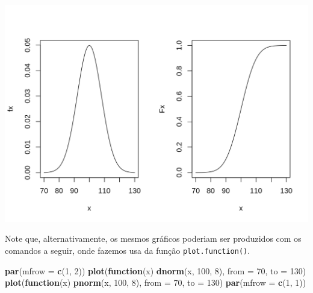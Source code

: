 \documentclass[10pt,a4paper]{book}
\newenvironment{Shaded}{\begin{snugshade}}{\end{snugshade}}
\newcommand{\KeywordTok}[1]{\textcolor[rgb]{0.13,0.29,0.53}{\textbf{#1}}}
\newcommand{\DataTypeTok}[1]{\textcolor[rgb]{0.13,0.29,0.53}{#1}}
\newcommand{\DecValTok}[1]{\textcolor[rgb]{0.00,0.00,0.81}{#1}}
\newcommand{\ControlFlowTok}[1]{\textcolor[rgb]{0.13,0.29,0.53}{\textbf{#1}}}
\newcommand{\NormalTok}[1]{#1}
\begin{document}
\begin{center}\includegraphics{figures/unnamed-chunk-343-1} \end{center}

Note que, alternativamente, os mesmos gráficos poderiam ser produzidos
com os comandos a seguir, onde fazemos usa da função
\texttt{plot.function()}.

\begin{Shaded}
\begin{Highlighting}[]
\KeywordTok{par}\NormalTok{(}\DataTypeTok{mfrow =} \KeywordTok{c}\NormalTok{(}\DecValTok{1}\NormalTok{, }\DecValTok{2}\NormalTok{))}
\KeywordTok{plot}\NormalTok{(}\ControlFlowTok{function}\NormalTok{(x) }\KeywordTok{dnorm}\NormalTok{(x, }\DecValTok{100}\NormalTok{, }\DecValTok{8}\NormalTok{), }\DataTypeTok{from =} \DecValTok{70}\NormalTok{, }\DataTypeTok{to =} \DecValTok{130}\NormalTok{)}
\KeywordTok{plot}\NormalTok{(}\ControlFlowTok{function}\NormalTok{(x) }\KeywordTok{pnorm}\NormalTok{(x, }\DecValTok{100}\NormalTok{, }\DecValTok{8}\NormalTok{), }\DataTypeTok{from =} \DecValTok{70}\NormalTok{, }\DataTypeTok{to =} \DecValTok{130}\NormalTok{)}
\KeywordTok{par}\NormalTok{(}\DataTypeTok{mfrow =} \KeywordTok{c}\NormalTok{(}\DecValTok{1}\NormalTok{, }\DecValTok{1}\NormalTok{))}
\end{Highlighting}
\end{Shaded}
\end{document}
